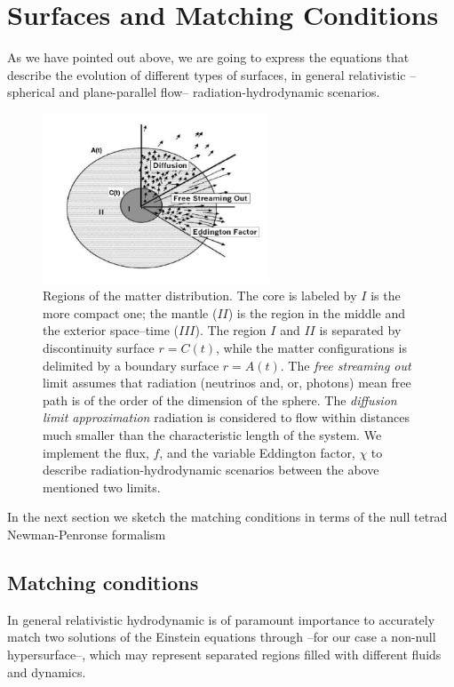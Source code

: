 \documentclass[notitlepage,letterpaper, 10pt]{article}
\begin{document}
\section{Surfaces and Matching Conditions}
As we have pointed out above, we are going to express the equations that describe the evolution of different types of surfaces, in general relativistic --spherical and plane-parallel flow-- radiation-hydrodynamic scenarios. 

\begin{figure}[!ht]
\begin{center}
\includegraphics[width=0.6\textwidth]{GridChoqueEsfera.png}
\caption{Regions of the matter distribution. The core is labeled by $I$ is the more compact one; the mantle ($II$) is the region in the middle and the exterior space--time ($III$). The region $I$ and $II$ is separated by discontinuity surface $r = C(t)$, while the matter configurations is delimited by a boundary surface $r =A(t)$. The {\em free streaming out} limit assumes that radiation (neutrinos and, or, photons) mean free path is of the order of the dimension of the sphere. The {\em diffusion limit approximation} radiation is considered to flow within distances much smaller than the characteristic length of the system. We implement the flux, $f$, and the variable Eddington factor, $\chi$ to describe radiation-hydrodynamic scenarios between the above mentioned two limits.}
\label{Sphere}
\end{center}
\end{figure}


In the next section we sketch the matching conditions in terms of the null tetrad Newman-Penronse formalism

\subsection{Matching conditions}
In general relativistic hydrodynamic is of paramount importance to accurately match two solutions of the Einstein equations through --for our case a non-null hypersurface--, which may represent separated regions filled with different fluids and dynamics\cite{BonnorVickers1981}. 
\end{document}
